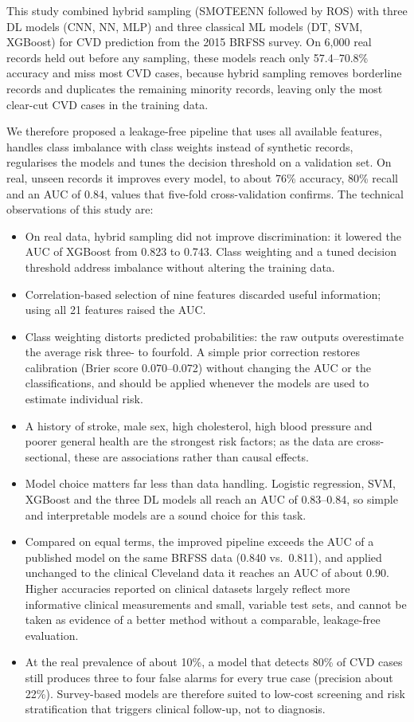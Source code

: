 This study combined hybrid sampling (SMOTEENN followed by ROS) with three
DL models (CNN, NN, MLP) and three classical ML models (DT, SVM, XGBoost)
for CVD prediction from the 2015 BRFSS survey. On 6,000 real records held
out before any sampling, these models reach only 57.4--70.8\% accuracy and
miss most CVD cases, because hybrid sampling removes borderline records and
duplicates the remaining minority records, leaving only the most clear-cut
CVD cases in the training data.

We therefore proposed a leakage-free pipeline that uses all available
features, handles class imbalance with class weights instead of synthetic
records, regularises the models and tunes the decision threshold on a
validation set. On real, unseen records it improves every model, to about
76\% accuracy, 80\% recall and an AUC of 0.84, values that five-fold
cross-validation confirms. The technical observations of this study are:

\begin{itemize}
  \item On real data, hybrid sampling did not improve discrimination: it
    lowered the AUC of XGBoost from 0.823 to 0.743. Class weighting and a
    tuned decision threshold address imbalance without altering the
    training data.
  \item Correlation-based selection of nine features discarded useful
    information; using all 21 features raised the AUC.
  \item Class weighting distorts predicted probabilities: the raw outputs
    overestimate the average risk three- to fourfold. A simple prior correction
    restores calibration (Brier score 0.070--0.072) without changing the
    AUC or the classifications, and should be applied whenever the models
    are used to estimate individual risk.
  \item A history of stroke, male sex, high cholesterol, high blood
    pressure and poorer general health are the strongest risk factors; as
    the data are cross-sectional, these are associations rather than causal
    effects.
  \item Model choice matters far less than data handling. Logistic
    regression, SVM, XGBoost and the three DL models all reach an AUC of
    0.83--0.84, so simple and interpretable models are a sound choice for
    this task.
  \item Compared on equal terms, the improved pipeline exceeds the AUC of a
    published model on the same BRFSS data (0.840 vs.\ 0.811), and applied
    unchanged to
    the clinical Cleveland data it reaches an AUC of about 0.90. Higher
    accuracies reported on clinical datasets largely reflect more
    informative clinical measurements and small, variable test sets, and
    cannot be taken as evidence of a better method without a comparable,
    leakage-free evaluation.
  \item At the real prevalence of about 10\%, a model that detects 80\% of
    CVD cases still produces three to four false alarms for every true case
    (precision about 22\%). Survey-based models are therefore suited to
    low-cost screening and risk stratification that triggers clinical
    follow-up, not to diagnosis.
\end{itemize}

